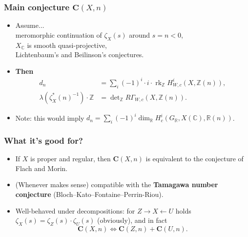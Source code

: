 \documentclass[handout]{beamer}
\newcommand{\ZZ}{\mathbb{Z}}
\newcommand{\RR}{\mathbb{R}}
\newcommand{\CC}{\mathbb{C}}
\DeclareMathOperator{\rk}{rk}
\begin{document}

\begin{frame}
  \frametitle{Main conjecture $\mathbf{C} (X,n)$}

  \begin{itemize}
  \item<2-> Assume...\\
    \hspace{1em}meromorphic continuation of $\zeta_X (s)$ around $s = n < 0$,\\
    \hspace{1em}$X_\CC$ is smooth quasi-projective,\\
    \hspace{1em}Lichtenbaum's and Beilinson's conjectures.

  \item<3-> \textbf{Then}
    \begin{align*}
      d_n & = \sum_i (-1)^i \cdot i \cdot \rk_\ZZ H^i_{W,c} (X, \ZZ (n)),\\
      \lambda (\zeta_X^* (n)^{-1})\cdot \ZZ & = \det\nolimits_\ZZ R\Gamma_{W,c} (X, \ZZ (n)).
    \end{align*}

  \item<4-> Note: this would imply
    $d_n = \sum_i (-1)^i \dim_\RR H_c^i (G_\RR, X (\CC), \RR (n))$.
  \end{itemize}
\end{frame}


\begin{frame}
  \frametitle{What it's good for?}

  \begin{itemize}
  \item<2-> If $X$ is proper and regular, then $\mathbf{C} (X,n)$ is equivalent
    to the conjecture of Flach and Morin.

  \item<3-> (Whenever makes sense) compatible with the
    \textbf{Tamagawa number conjecture} (Bloch--Kato--Fontaine--Perrin-Riou).

  \item<4-> Well-behaved under decompositions: for $Z \to X \leftarrow U$ holds
    $\zeta_X (s) = \zeta_Z (s) \cdot \zeta_U (s)$ (obviously), and in fact
    $$\mathbf{C} (X,n) \iff \mathbf{C} (Z,n) + \mathbf{C} (U,n).$$
  \end{itemize}
\end{frame}
\end{document}
